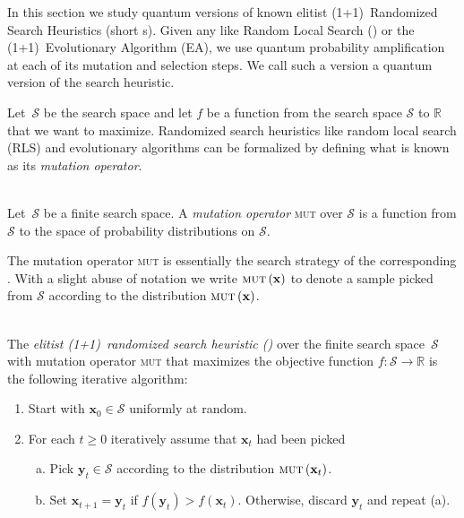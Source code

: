 In this section we study quantum versions of known elitist (1+1)~Randomized Search Heuristics (short \rsh{}s). Given any \rsh like Random Local Search (\rls) or the (1+1)~Evolutionary Algorithm (EA), we use quantum probability amplification at each of its mutation and selection steps. We call such a version a quantum version of the search heuristic.

Let~$\mathcal{S}$ be the search space and let $f$ be a function from the search space $\mathcal{S}$ to $\mathbb{R}$ that we want to maximize. Randomized search heuristics like random local search (RLS) and evolutionary algorithms can be formalized by defining what is known as its \emph{mutation operator}.
\begin{definition}~\\
Let~$\mathcal{S}$ be a finite search space. A \emph{mutation operator} \textsc{mut} over $\mathcal{S}$ is a function from $\mathcal{S}$ to the space of probability distributions on $\mathcal{S}$.
\end{definition}

The mutation operator \textsc{mut} is essentially the search strategy of the corresponding \rsh. With a slight abuse of notation we write $\textsc{mut}\left(\mathbf{x}\right)$ to denote a sample picked from $\mathcal{S}$ according to the distribution $\textsc{mut}\left(\mathbf{x}\right)$.
\begin{algorithm}[\rsh]\label{algo:rsh}~\\
The \emph{elitist (1+1)~randomized search heuristic (\rsh)} over the finite search space~$\mathcal{S}$ with mutation operator \textsc{mut} that maximizes the objective function $f:\mathcal{S}\to\mathbb{R}$ is the following iterative algorithm:
  \begin{enumerate}
 \item Start with $\mathbf{x}_0 \in \mathcal{S}$ uniformly at random.
 \item For each $t\geq 0$ iteratively assume that $\mathbf{x}_t$ had been
 picked
 \begin{enumerate}[(a)]
 \item \label{step:mutate} Pick $\mathbf{y}_t \in \mathcal{S}$
  according to the distribution $\textsc{mut}\left(\mathbf{x}_t\right)$.
 \item \label{step:pick} Set $\mathbf{x}_{t+1} = \mathbf{y}_t$ if
  $f(\mathbf{y}_t) > f(\mathbf{x}_t)$. Otherwise, discard $\mathbf{y}_t$ and 
  repeat (a).
 \end{enumerate}
 \end{enumerate}
\end{algorithm}

